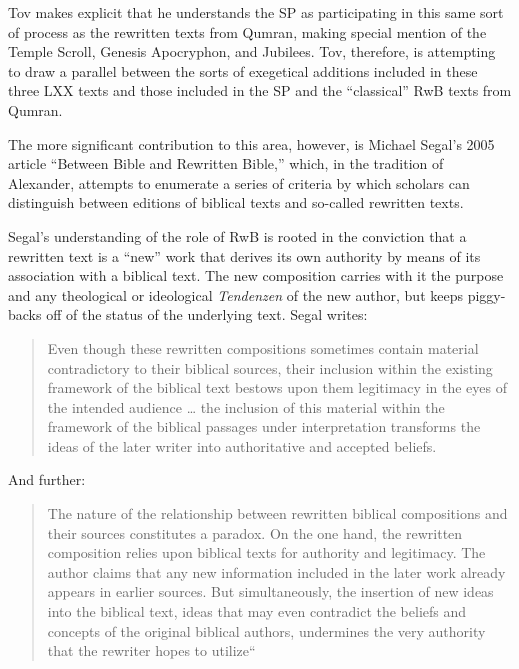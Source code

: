 Tov makes explicit that he understands the SP as participating in this
same sort of process as the rewritten texts from Qumran, making special
mention of the Temple Scroll, Genesis Apocryphon, and Jubilees. Tov,
therefore, is attempting to draw a parallel between the sorts of
exegetical additions included in these three LXX texts and those
included in the SP and the ``classical'' RwB texts from Qumran.

The more significant contribution to this area, however, is Michael
Segal's 2005 article ``Between Bible and Rewritten Bible,'' which, in
the tradition of Alexander, attempts to enumerate a series of criteria
by which scholars can distinguish between editions of biblical texts and
so-called rewritten texts.

Segal's understanding of the role of RwB is rooted in the conviction
that a rewritten text is a ``new'' work that derives its own authority
by means of its association with a biblical text. The new composition
carries with it the purpose and any theological or ideological
\emph{Tendenzen} of the new author, but keeps piggy-backs off of the
status of the underlying text.\autocite[11]{segal_henze2005} Segal
writes:

\begin{quote}
Even though these rewritten compositions sometimes contain material
contradictory to their biblical sources, their inclusion within the
existing framework of the biblical text bestows upon them legitimacy in
the eyes of the intended audience \ldots{} the inclusion of this
material within the framework of the biblical passages under
interpretation transforms the ideas of the later writer into
authoritative and accepted beliefs.\autocite[11]{segal_henze2005}
\end{quote}

And further:

\begin{quote}
The nature of the relationship between rewritten biblical compositions
and their sources constitutes a paradox. On the one hand, the rewritten
composition relies upon biblical texts for authority and legitimacy. The
author claims that any new information included in the later work
already appears in earlier sources. But simultaneously, the insertion of
new ideas into the biblical text, ideas that may even contradict the
beliefs and concepts of the original biblical authors, undermines the
very authority that the rewriter hopes to
utilize``\autocite[11-12]{segal_henze2005}
\end{quote}


